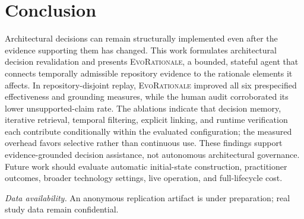 \documentclass[10pt,conference]{IEEEtran}
\begin{document}
\vspace{-2mm}
\section{Conclusion}
\label{sec:conclusion}
Architectural decisions can remain structurally implemented even after the evidence supporting them has changed. This work formulates architectural decision revalidation and presents \textsc{EvoRationale}, a bounded, stateful agent that connects temporally admissible repository evidence to the rationale elements it affects. In repository-disjoint replay, \textsc{EvoRationale} improved all six prespecified effectiveness and grounding measures, while the human audit corroborated its lower unsupported-claim rate. The ablations indicate that decision memory, iterative retrieval, temporal filtering, explicit linking, and runtime verification each contribute conditionally within the evaluated configuration; the measured overhead favors selective rather than continuous use. These findings support evidence-grounded decision assistance, not autonomous architectural governance. Future work should evaluate automatic initial-state construction, practitioner outcomes, broader technology settings, live operation, and full-lifecycle cost.\par\noindent\textit{Data availability.} An anonymous replication artifact is under preparation; real study data remain confidential.




\balance

\end{document}
